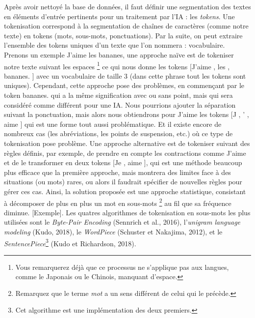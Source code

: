 \documentclass[12pt, french, twoside]{report}
\begin{document}
Après avoir nettoyé la base de données, il faut définir une segmentation des textes en éléments d'entrée pertinents pour un traitement par l'IA : les \textit{tokens}. Une tokenisation correspond à la segmentation de chaînes de caractères (comme notre texte) en tokens (mots, sous-mots, ponctuations). Par la suite, on peut extraire l'ensemble des tokens uniques d'un texte que l'on nommera : vocabulaire.
Prenons un exemple \og J'aime les bananes\fg, une approche naïve est de tokeniser notre texte suivant les espaces \footnote{Vous remarquerez déjà que ce processus ne s'applique pas aux langues, comme le Japonais ou le Chinois, manquant d'espace.} ce qui nous donne les tokens [\og J'aime \fg, \og les \fg, \og bananes. \fg] avec un vocabulaire de taille 3 (dans cette phrase tout les tokens sont uniques). Cependant, cette approche pose des problèmes, en commençant par le token \og bananes. \fg qui a la même signification avec ou sans point, mais qui sera considéré comme différent pour une IA. Nous pourrions ajouter la séparation suivant la ponctuation, mais alors nous obtiendrons pour \og J'aime \fg les tokens [\og J \fg, \og ' \fg, \og aime \fg] qui est une forme tout aussi problématique. Et il existe encore de nombreux cas (les abréviations, les points de suspension, etc.) où ce type de tokenisation pose problème. Une approche alternative est de tokeniser suivant des règles définis, par exemple, de prendre en compte les contractions comme \og J'aime \fg et de le transformer en deux tokens [\og Je \fg, \og aime \fg], qui est une méthode beaucoup plus efficace que la première approche, mais montrera des limites face à des situations (ou mots) rares, ou alors il faudrait spécifier de nouvelles règles pour gérer ces cas. Ainsi, la solution proposée est une approche statistique, consistant à décomposer de plus en plus un mot en sous-mots \footnote{Remarquez que le terme \textit{mot} a un sens différent de celui qui le précède.} au fil que sa fréquence diminue. [Exemple]. Les quatres algorithmes de tokenisation en sous-mots les plus utilisées sont le \textit{Byte-Pair Encoding} (Sennrich et al., 2016), l'\textit{unigram language modeling} (Kudo, 2018), le \textit{WordPiece} (Schuster et Nakajima, 2012), et le \textit{SentencePiece}\footnote{Cet algorithme est une implémentation des deux premiers.} (Kudo et Richardson, 2018).\cite{jurafsky_regular}\\
\end{document}
